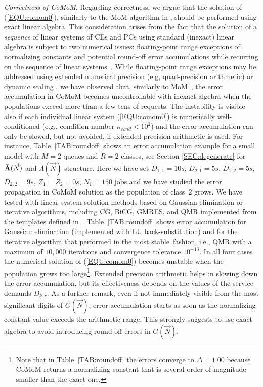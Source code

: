 \documentclass[journal,twocolumn,9.5pt]{IEEEtran}
\newcommand{\comom}[1]{\bar{#1}}
\begin{document}
{\em Correctness of CoMoM}. Regarding correctness, we argue that the solution of (\ref{EQU:comom0}), similarly to the MoM algorithm in \cite{Cas06b}, should be performed using {exact} linear algebra. This consideration arises from the fact that the solution of a {\em sequence} of linear systems of CEs and PCs using standard ({inexact}) linear algebra is subject to two numerical issues: floating-point range exceptions of normalizing constants \cite{Lam82} and potential round-off error accumulations while recurring on the sequence of linear systems~\cite{Cas06b}.
While floating-point range exceptions may be addressed using extended numerical precision (e.g, quad-precision arithmetic) or dynamic scaling \cite{Lam82}, we have observed that, similarly to MoM~\cite{Cas06b}, the error accumulation in CoMoM becomes uncontrollable with inexact algebra when the populations exceed more than a few tens of requests. The instability is visible also if each individual linear system (\ref{EQU:comom0}) is numerically well-conditioned (e.g., condition number $\kappa_{cond} < 10^2$) and the error accumulation can only be slowed, but not avoided, if extended precision arithmetic is used. For instance, Table~\ref{TAB:roundoff} shows an error accumulation example for a small model with $M=2$ queues and $R=2$ classes, see Section \ref{SEC:degenerate} for ${\bf \comom{A}}(\vec N)$ and $\Lambda(\vec N)$ structure. Here we have set $D_{1,1}=10 s$, $D_{2,1}=5 s$, $D_{1,2}=5 s$,  $D_{2,2}=9 s$, $Z_1=Z_2=0 s$, $N_1=150$ jobs and we have studied the error propagation in CoMoM solution as the population of class~$2$ grows. We have tested with linear system solution methods based on Gaussian elimination or iterative algorithms, including CG, BiCG, GMRES, and QMR implemented from the templates defined in~\cite{Bar94}. Table~\ref{TAB:roundoff} shows error accumulation for Gaussian elimination (implemented with LU back-substitution) and for the iterative algorithm that performed in the most stable~fashion, i.e., QMR with a maximum of $10,000$ iterations and convergence tolerance $10^{-13}$. In all four cases the numerical solution of (\ref{EQU:comom0}) becomes unstable when the population grows too large\footnote{Note that in Table~\ref{TAB:roundoff} the errors converge to $\Delta=1.00$ because CoMoM returns a normalizing constant that is several order of magnitude smaller than the exact one.}. Extended precision arithmetic helps in slowing down the error accumulation, but its effectiveness depends on the values of the service demands $D_{k,r}$. As a further remark, even if not immediately visible from the most significant digits of $G(\vec N)$, error accumulation starts as soon as the normalizing constant value exceeds the arithmetic range. This strongly suggests to use exact algebra to avoid introducing round-off errors in $G(\vec N)$.
\end{document}
